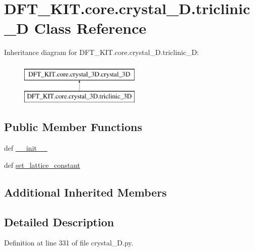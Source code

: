 \hypertarget{class_d_f_t___k_i_t_1_1core_1_1crystal__3_d_1_1triclinic__3_d}{\section{D\+F\+T\+\_\+\+K\+I\+T.\+core.\+crystal\+\_\+D.\+triclinic\+\_\+D Class Reference}
\label{class_d_f_t___k_i_t_1_1core_1_1crystal__3_d_1_1triclinic__3_d}
}
Inheritance diagram for D\+F\+T\+\_\+\+K\+I\+T.\+core.\+crystal\+\_\+D.\+triclinic\+\_\+D\+:\begin{figure}[H]
\begin{center}
\leavevmode
\includegraphics[height=2.000000cm]{class_d_f_t___k_i_t_1_1core_1_1crystal__3_d_1_1triclinic__3_d}
\end{center}
\end{figure}
\subsection*{Public Member Functions}
\begin{DoxyCompactItemize}
\item 
def \hyperlink{class_d_f_t___k_i_t_1_1core_1_1crystal__3_d_1_1triclinic__3_d_adc82f93ad5bd06a39519d84d2d7dc653}{\+\_\+\+\_\+init\+\_\+\+\_\+}
\item 
def \hyperlink{class_d_f_t___k_i_t_1_1core_1_1crystal__3_d_1_1triclinic__3_d_a6bc4b124df096336888c92ea43ec1158}{set\+\_\+lattice\+\_\+constant}
\end{DoxyCompactItemize}
\subsection*{Additional Inherited Members}


\subsection{Detailed Description}


Definition at line 331 of file crystal\+\_\+D.\+py.



